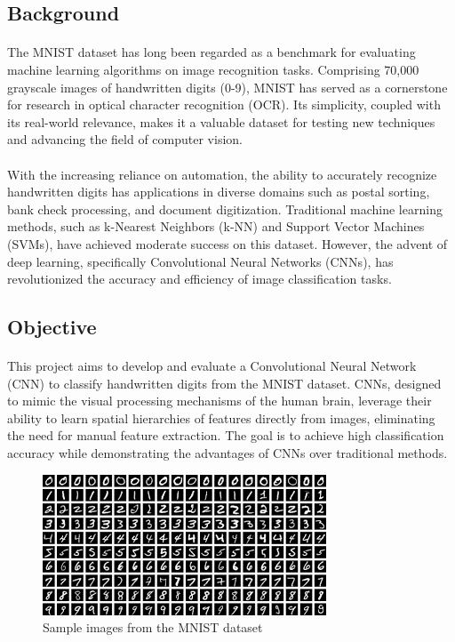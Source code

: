 \subsection{Background}

\paragraph{}The MNIST dataset has long been regarded as a benchmark for evaluating machine learning 
algorithms on image recognition tasks. Comprising 70,000 grayscale images of handwritten digits 
(0-9), MNIST has served as a cornerstone for research in optical character recognition (OCR). Its 
simplicity, coupled with its real-world relevance, makes it a valuable dataset for testing new 
techniques and advancing the field of computer vision.

\paragraph{}With the increasing reliance on automation, the ability to accurately recognize handwritten digits 
has applications in diverse domains such as postal sorting, bank check processing, and document 
digitization. Traditional machine learning methods, such as k-Nearest Neighbors (k-NN) and Support 
Vector Machines (SVMs), have achieved moderate success on this dataset. However, the advent of deep 
learning, specifically Convolutional Neural Networks (CNNs), has revolutionized the accuracy and 
efficiency of image classification tasks.

\subsection{Objective}

\paragraph{}This project aims to develop and evaluate a Convolutional Neural Network (CNN) to 
classify handwritten digits from the MNIST dataset. CNNs, designed to mimic the visual processing 
mechanisms of the human brain, leverage their ability to learn spatial hierarchies of features 
directly from images, eliminating the need for manual feature extraction. The goal is to achieve 
high classification accuracy while demonstrating the advantages of CNNs over traditional methods.

\begin{figure}[H]
  \begin{center}
    \includegraphics{img/introduction/mnist.png}
    \caption{Sample images from the MNIST dataset}
  \end{center}
\end{figure}
